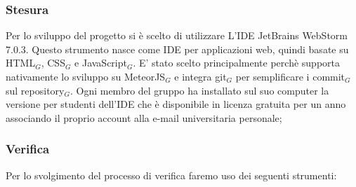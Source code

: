 \subsubsection{Stesura}
    Per lo sviluppo del progetto si è scelto di utilizzare L’IDE JetBrains WebStorm 7.0.3. Questo strumento nasce come IDE per applicazioni web, quindi basate su HTML$_G$, CSS$_G$ e JavaScript$_G$. E' stato scelto principalmente perchè supporta nativamente lo sviluppo su MeteorJS$_G$ e integra git$_G$ per semplificare i commit$_G$ sul repository$_G$. Ogni membro del gruppo ha installato sul suo computer la versione per studenti dell'IDE che è disponibile in licenza gratuita per un anno associando il proprio account alla e-mail universitaria personale; 


\subsubsection{Verifica}
Per lo svolgimento del processo di verifica faremo uso dei seguenti strumenti:
